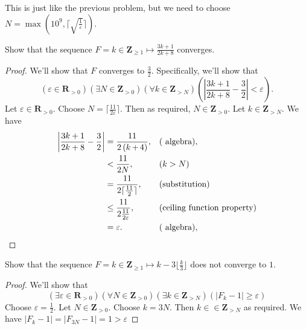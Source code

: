 \documentclass[12pt, fleqn, answers]{exam}
\newcommand{\reals}{\mathbf{R}}
\newcommand{\integers}{\mathbf{Z}}
\begin{document}
\begin{questions}
\begin{solution} This is just like the previous problem, but we need to choose $N = \max(10^9,  \lceil \sqrt{\frac{1}{\varepsilon}} \rceil)$.

\end{solution}

\question Show that the sequence $F = k \in \integers_{\geq 1} \mapsto \frac{3 k+ 1}{2 k + 8}$ converges.

\begin{solution}
\begin{proof} We'll show that $F$ converges to $\frac{3}{2}$. Specifically,
  we'll show that 
  \begin{equation*}
    \left(\varepsilon \in \reals_{> 0} \right)
    \left(\exists N \in \integers_{> 0} \right)
    \left(\forall k \in \integers_{> N} \right)
   \left( \left| \frac{ 3k+1}{2 k + 8} - \frac{3}{2} \right| < \varepsilon \right).
  \end{equation*}
Let $\varepsilon \in \reals_{> 0}$. Choose $N = \lceil \frac{11}{2 \varepsilon} \rceil$.
Then as required, $N \in \integers_{> 0}$. Let $k \in \integers_{>N}$. 
We have
\begin{align*}
 \left| \frac{ 3k+1}{2 k + 8} - \frac{3}{2} \right| &= \frac{11}{2 \left( k\operatorname{+}4\right) }, 
                &&\mbox{(\text{ algebra})},\\
                &< \frac{11}{2 N}, && (k > N) \\
                &=  \frac{11}{2 \lceil \frac{11}{2} \rceil}, && \mbox{(substitution)} \\
                &\leq \frac{11}{2 \frac{11}{2 \varepsilon}},  && \mbox{(ceiling function property)} \\
                &=  \varepsilon. &&\mbox{(\text{ algebra})},
\end{align*}

\end{proof}
\end{solution}
\question Show that the sequence $F = k \in \integers_{\geq 1} \mapsto k - 3 \lfloor \frac{k}{3} \rfloor $ does 
not converge to $1$.

\begin{solution}
\begin{proof}  We'll show that
\begin{equation*}
  \left(\exists \varepsilon \in \reals_{> 0} \right)
  \left(\forall  N \in \integers_{> 0} \right)
   \left(\exists  k \in \integers_{> N} \right)
   \left(  | F_k - 1 | \geq \varepsilon \right)
\end{equation*}
Choose $\varepsilon = \frac{1}{2}$. Let $N \in \integers_{>0}$. Choose $k = 3 N$. Then $k \in \in \integers_{> N}$
as required. We have $|F_k - 1| = |F_{3 N} -1 | = 1 > \varepsilon$
\end{proof}
\end{solution}


\end{questions}
\end{document}
